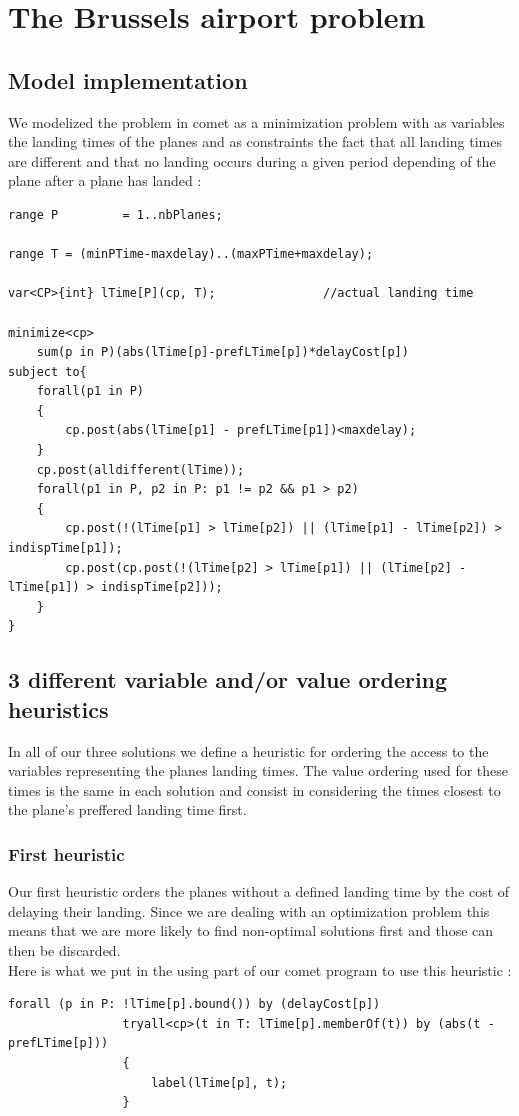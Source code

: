 \documentclass{eplDoc}
\begin{document}
\maketitle
\newpage

\section{The Brussels airport problem} %

\subsection{Model implementation}
We modelized the problem in comet as a minimization problem with as variables the landing times of the planes and as constraints the fact that all landing times are different and that no landing occurs during a given period depending of the plane after a plane has landed : 
\begin{lstlisting}
range P         = 1..nbPlanes;

range T = (minPTime-maxdelay)..(maxPTime+maxdelay);

var<CP>{int} lTime[P](cp, T);               //actual landing time

minimize<cp>
    sum(p in P)(abs(lTime[p]-prefLTime[p])*delayCost[p])
subject to{
    forall(p1 in P)
    {
        cp.post(abs(lTime[p1] - prefLTime[p1])<maxdelay);
    }
    cp.post(alldifferent(lTime));
    forall(p1 in P, p2 in P: p1 != p2 && p1 > p2)
    {
        cp.post(!(lTime[p1] > lTime[p2]) || (lTime[p1] - lTime[p2]) > indispTime[p1]); 
        cp.post(cp.post(!(lTime[p2] > lTime[p1]) || (lTime[p2] - lTime[p1]) > indispTime[p2]));
    }
}
\end{lstlisting}
\subsection{3 different variable and/or value ordering heuristics}
In all of our three solutions we define a heuristic for ordering the access to the variables representing the planes landing times. The value ordering used for these times is the same in each solution and consist in considering the times closest to the plane's preffered landing time first. 
\subsubsection{First heuristic}
Our first heuristic orders the planes without a defined landing time by the cost of delaying their landing. Since we are dealing with an optimization problem this means that we are more likely to find non-optimal solutions first and those can then be discarded. \\  
Here is what we put in the using part of our comet program to use this heuristic : 
\begin{lstlisting}
forall (p in P: !lTime[p].bound()) by (delayCost[p])
                tryall<cp>(t in T: lTime[p].memberOf(t)) by (abs(t - prefLTime[p]))
                {
                    label(lTime[p], t);
                } 
\end{lstlisting}
\end{document}
